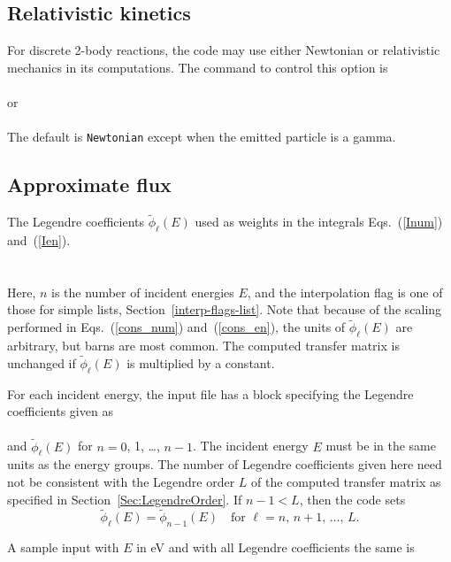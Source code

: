 \subsection{Relativistic kinetics}\label{Sec:relativistic}
For discrete 2-body reactions, 
the code may use either Newtonian or relativistic mechanics in its
computations.  The command to control this option is\\
  \\
or\\
  \\
The default is \texttt{Newtonian} except when the emitted particle is a gamma.

\subsection{Approximate flux}
The Legendre coefficients $\widetilde \phi_\ell(E)$ used as weights in
the integrals Eqs.~(\ref{Inum}) and~(\ref{Ien}).\\
  \\
  \\
Here, $n$ is the number of incident energies $E$, and
the interpolation flag is one of those for simple lists, Section~\ref{interp-flags-list}.
Note that because of the scaling performed in Eqs.~(\ref{cons_num})
and~(\ref{cons_en}), the units of $\widetilde \phi_\ell(E)$
are arbitrary, but barns are most common.  The computed transfer matrix is unchanged if
$\widetilde \phi_\ell(E)$ is multiplied by a constant.

For each incident energy, the input file has a block specifying
the Legendre coefficients  given as\\
 \\
and $\widetilde \phi_\ell(E)$ for $n = 0$, 1, \ldots , $n - 1$.
The incident energy $E$ must be in the same units as the
energy groups.
The number of Legendre coefficients given here need not be
consistent with the Legendre order $L$ of the computed transfer
matrix as specified in Section~\ref{Sec:LegendreOrder}.  
If $n - 1 < L$, then the {\gettransfer} code sets
$$
  \widetilde \phi_\ell(E) = \widetilde \phi_{n - 1}(E)
  \quad \text{for $\ell = n$, $n+1$, \ldots, $L$.}
$$

A sample input with $E$ in eV and with all Legendre coefficients
the same is\\
  \\
  \\
  \\
  \\
  \\

